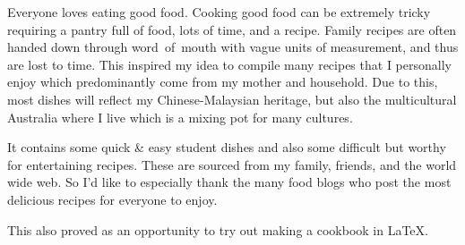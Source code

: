 \newenvironment{abstract}%
    {\cleardoublepage\thispagestyle{empty}\null\vfill\begin{center}%
    \bfseries\abstractname\end{center}}%
    {\vfill\null}
        \begin{abstract}
        Everyone loves eating good food. Cooking good food can be extremely tricky requiring a pantry full of food, lots of time, and a recipe. Family recipes are often handed down through word~of~mouth with vague units of measurement, and thus are lost to time. This inspired my idea to compile many recipes that I personally enjoy which predominantly come from my mother and household. Due to this, most dishes will reflect my Chinese-Malaysian heritage, but also the multicultural Australia where I live which is a mixing pot for many cultures.  
            
        It contains some quick \& easy student dishes and also some difficult but worthy for entertaining recipes. These are sourced from my family, friends, and the world wide web. So I'd like to especially thank the many food blogs who post the most delicious recipes for everyone to enjoy.

        This also proved as an opportunity to try out making a cookbook in \LaTeX.

        \end{abstract}

        
